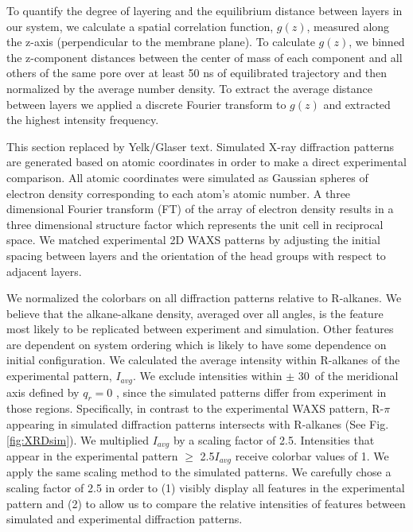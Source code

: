 \documentclass{article}
\begin{document}
  To quantify the degree of layering and the equilibrium distance between layers
  in our system, we calculate a spatial correlation function, $g(z)$, measured
  along the z-axis (perpendicular to the membrane plane). To calculate $g(z)$,
  we binned the z-component distances between the center of mass of each
  component and all others of the same pore over at least 50 ns of equilibrated
  trajectory and then normalized by the average number density. To extract the
  average distance between layers we applied a discrete Fourier transform to
  $g(z)$ and extracted the highest intensity frequency.

  {\color{red}This section replaced by Yelk/Glaser text}. 
  Simulated X-ray diffraction patterns are generated based on atomic
  coordinates in order to make a direct experimental comparison. All atomic
  coordinates were simulated as Gaussian spheres of electron density
  corresponding to each atom's atomic number. A three dimensional Fourier
  transform (FT) of the array of electron density results in a three dimensional
  structure factor which represents the unit cell in reciprocal space. We matched
  experimental 2D WAXS patterns by adjusting the initial spacing between layers
  and the orientation of the head groups with respect to adjacent layers.

  We normalized the colorbars on all diffraction patterns relative to
  R-alkanes. We believe that the alkane-alkane density, averaged over all angles,
  is the feature most likely to be replicated between experiment and simulation.
  Other features are dependent on system ordering which is likely to have some
  dependence on initial configuration. We calculated the average intensity within
  R-alkanes of the experimental pattern, $I_{avg}$. We exclude intensities
  within $\pm$ 30\degree~of the meridional axis defined by $q_r=0$ , since the simulated patterns differ
  from experiment in those regions. Specifically, in contrast to the
  experimental WAXS pattern, R-$\pi$ appearing in simulated diffraction patterns
  intersects with R-alkanes (See Fig. \ref{fig:XRDsim}). We multiplied $I_{avg}$
  by a scaling factor of 2.5. Intensities that appear in the experimental pattern
  $\geq$ 2.5$I_{avg}$ receive colorbar values of 1. We apply the same scaling
  method to the simulated patterns. We carefully chose a scaling factor of 2.5 in
  order to (1) visibly display all features in the experimental pattern and (2)
  to allow us to compare the relative intensities of features between simulated
  and experimental diffraction patterns.
\end{document}
